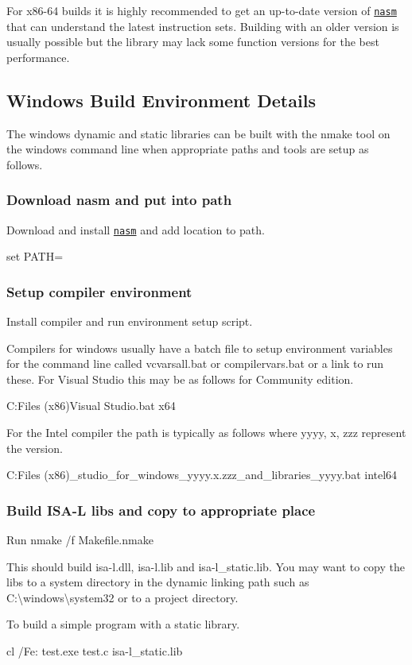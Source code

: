 For x86-\/64 builds it is highly recommended to get an up-\/to-\/date version of \href{https://www.nasm.us}{\tt nasm} that can understand the latest instruction sets. Building with an older version is usually possible but the library may lack some function versions for the best performance.

\subsection*{Windows Build Environment Details}

The windows dynamic and static libraries can be built with the nmake tool on the windows command line when appropriate paths and tools are setup as follows.

\subsubsection*{Download nasm and put into path}

Download and install \href{https://www.nasm.us}{\tt nasm} and add location to path. \begin{DoxyVerb}set PATH=%
\end{DoxyVerb}


\subsubsection*{Setup compiler environment}

Install compiler and run environment setup script.

Compilers for windows usually have a batch file to setup environment variables for the command line called {\ttfamily vcvarsall.\-bat} or {\ttfamily compilervars.\-bat} or a link to run these. For Visual Studio this may be as follows for Community edition. \begin{DoxyVerb}C:\Program Files (x86)\Microsoft Visual Studio\Community\VC\Auxiliary\Build\vcvarsall.bat x64
\end{DoxyVerb}


For the Intel compiler the path is typically as follows where yyyy, x, zzz represent the version. \begin{DoxyVerb}C:\Program Files (x86)\IntelSWTools\system_studio_for_windows_yyyy.x.zzz\compilers_and_libraries_yyyy\bin\compilervars.bat intel64
\end{DoxyVerb}


\subsubsection*{Build I\-S\-A-\/\-L libs and copy to appropriate place}

Run {\ttfamily nmake /f Makefile.\-nmake}

This should build isa-\/l.\-dll, isa-\/l.\-lib and isa-\/l\-\_\-static.\-lib. You may want to copy the libs to a system directory in the dynamic linking path such as {\ttfamily C\-:\textbackslash{}windows\textbackslash{}system32} or to a project directory.

To build a simple program with a static library. \begin{DoxyVerb}cl /Fe: test.exe test.c isa-l_static.lib
\end{DoxyVerb}
 
